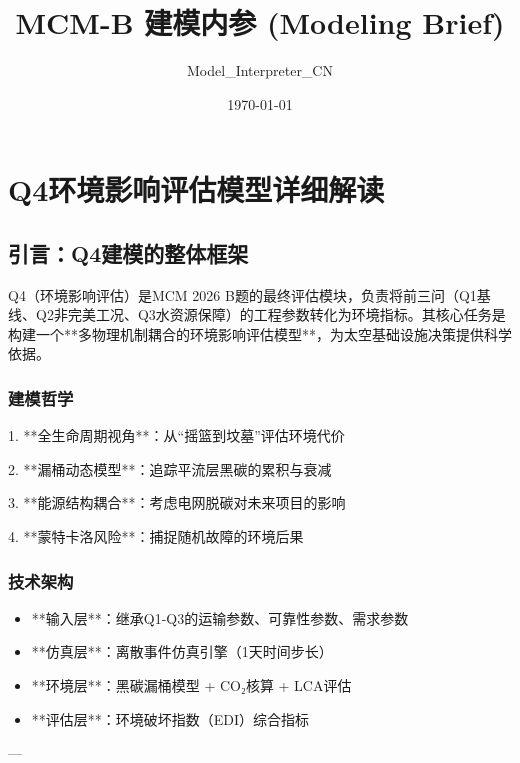 \documentclass[a4paper,12pt]{article}
\title{MCM-B 建模内参 (Modeling Brief)}
\author{Model_Interpreter_CN}
\date{\today}
\begin{document}
\maketitle
\tableofcontents
\newpage
\section{Q4环境影响评估模型详细解读}
\subsection{引言：Q4建模的整体框架}
Q4（环境影响评估）是MCM 2026 B题的最终评估模块，负责将前三问（Q1基线、Q2非完美工况、Q3水资源保障）的工程参数转化为环境指标。其核心任务是构建一个**多物理机制耦合的环境影响评估模型**，为太空基础设施决策提供科学依据。

\par
\subsubsection{建模哲学}
1. **全生命周期视角**：从“摇篮到坟墓”评估环境代价

\par
2. **漏桶动态模型**：追踪平流层黑碳的累积与衰减

\par
3. **能源结构耦合**：考虑电网脱碳对未来项目的影响

\par
4. **蒙特卡洛风险**：捕捉随机故障的环境后果

\par
\subsubsection{技术架构}
\begin{itemize}
\item **输入层**：继承Q1-Q3的运输参数、可靠性参数、需求参数
\end{itemize}
\begin{itemize}
\item **仿真层**：离散事件仿真引擎（1天时间步长）
\end{itemize}
\begin{itemize}
\item **环境层**：黑碳漏桶模型 + CO₂核算 + LCA评估
\end{itemize}
\begin{itemize}
\item **评估层**：环境破坏指数（EDI）综合指标
\end{itemize}
---
\end{document}
